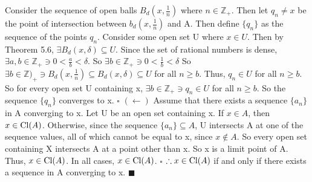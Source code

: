 \documentclass[12pt]{article}
\begin{document}
  \newline \newline
  Consider the sequence of open balls \(B_d(x, \frac{1}{n})\) where \(n \in \mathbb{Z}_+\).
  \newline
  Then let \(q_n \neq x\) be the point of intersection between \(b_d(x, \frac{1}{n})\) and A.
  \newline
  Then define \(\{q_n\}\) as the sequence of the points \(q_n\).
  \newline \newline
  Consider some open set U where \(x \in U\).
  \newline
  Then by Theorem 5.6, \(\exists B_d(x,\delta) \subseteq U\).
  \newline
  Since the set of rational numbers is dense, \(\exists a,b \in \mathbb{Z}_+ \ni 0 < \frac{a}{b} < \delta\).
  \newline
  So \(\exists b \in \mathbb{Z}_+ \ni 0 < \frac{1}{b} < \delta\)
  \newline
  So \(\exists b \in \mathbb{Z})_+ \ni B_d(x, \frac{1}{n}) \subseteq B_d(x, \delta) \subseteq U\) for all \(n \geq b\).
  \newline
  Thus, \(q_n \in U\) for all \(n \geq b\).
  \newline \newline
  So for every open set U containing x, \(\exists b \in \mathbb{Z}_+ \ni q_n \in U\) for all \(n \geq b\).
  \newline
  So the sequence \(\{q_n\}\) converges to x.
  \newline \(\square\) \newline
  \((\leftarrow)\) Assume that there exists a sequence \(\{a_n\}\) in A converging to x.
  \newline
  Let U be an open set containing x.
  \newline
  If \(x \in A\), then \(x \in \textup{Cl}(A)\).
  \newline
  Otherwise, since the sequence \(\{a_n\} \subseteq A\), U intersects A at one of the sequence values, all of which cannot be equal to x, since \(x \notin A\).
  \newline \newline
  So every open set containing X intersects A at a point other than x.
  \newline
  So x is a limit point of A.
  \newline
  Thus, \(x \in \textup{Cl}(A)\).
  \newline
  In all cases, \(x \in \textup{Cl}(A)\).
  \newline \(\square\) \newline
  \(\therefore x \in \textup{Cl}(A)\) if and only if there exists a sequence in A converging to x.
  \newline \(\blacksquare\)
\end{document}
